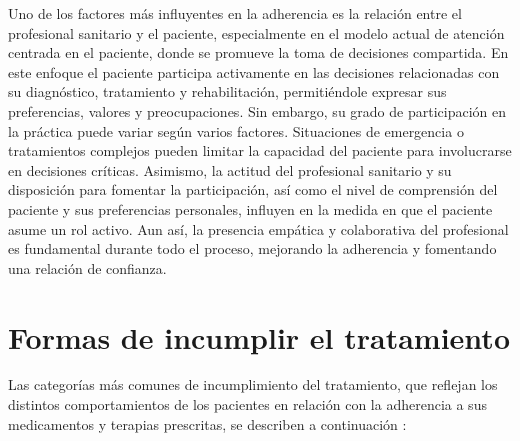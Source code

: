 Uno de los factores más influyentes en la adherencia es la relación entre el profesional sanitario y el paciente, especialmente en el modelo actual de atención centrada en el paciente, donde se promueve la toma de decisiones compartida. En este enfoque el paciente participa activamente en las decisiones relacionadas con su diagnóstico, tratamiento y rehabilitación, permitiéndole expresar sus preferencias, valores y preocupaciones. Sin embargo, su grado de participación en la práctica puede variar según varios factores. Situaciones de emergencia o tratamientos complejos pueden limitar la capacidad del paciente para involucrarse en decisiones críticas. Asimismo, la actitud del profesional sanitario y su disposición para fomentar la participación, así como el nivel de comprensión del paciente y sus preferencias personales, influyen en la medida en que el paciente asume un rol activo. Aun así, la presencia empática y colaborativa del profesional es fundamental durante todo el proceso, mejorando la adherencia y fomentando una relación de confianza. \cite{libroblanco2021}
\newpage

\section{Formas de incumplir el tratamiento}

Las categorías más comunes de incumplimiento del tratamiento, que reflejan los distintos comportamientos de los pacientes en relación con la adherencia a sus medicamentos y terapias prescritas, se describen a continuación \cite{ibarra2017adherencia}: 

